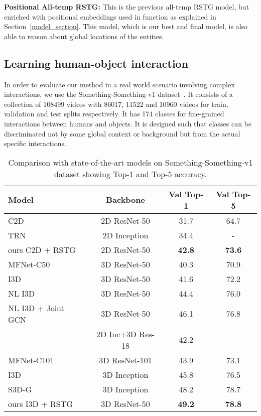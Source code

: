 \documentclass{article}
\begin{document}
\textbf{Positional All-temp RSTG:} This is the previous all-temp RSTG model, but enriched with positional embeddings used in  function as explained in Section~\ref{model_section}. This model, which is our best and final model, is also  able to reason about global locations of the entities.

\subsection{Learning human-object interaction}
In order to evaluate our method in a real world scenario involving complex interactions, we use the Something-Something-v1 dataset~\cite{goyal2017something}.
It consists of a collection of 108499 videos with 86017, 11522 and 10960 videos for train, validation and test splits respectively.  It has 174 classes for fine-grained interactions between humans and objects. It is designed such that classes can be discriminated not by some global context or background but from the actual specific interactions. 


\begin{table}[t]
    \fontsize{9}{10}\selectfont
    \caption{Comparison with state-of-the-art models on Something-Something-v1 dataset showing Top-1 and Top-5 accuracy. }
\centering
           \begin{tabular}{lccc}
                \toprule
                Model & Backbone & Val Top-1  & Val Top-5 \\ \midrule
                \midrule
C2D    &  2D ResNet-50 & 31.7 & 64.7 \\ TRN \cite{zhou2018temporal_trn_torralba}& 2D Inception & 34.4 & - \\ ours C2D + RSTG    &  2D ResNet-50 & \textbf{42.8} & \textbf{73.6} \\ \midrule
                \midrule
MFNet-C50~\cite{Lee2018MF_Net} & 3D ResNet-50 & 40.3 & 70.9 \\

                I3D \cite{wang2018videos_gupta2}    & 3D ResNet-50 & 41.6 & 72.2  \\NL I3D \cite{wang2018videos_gupta2}    & 3D ResNet-50 & 44.4 & 76.0 \\

                NL I3D + Joint GCN \cite{wang2018videos_gupta2}    &  3D ResNet-50 & 46.1 & 76.8\\\midrule 
                ~\cite{zolfaghari2018eco} & 2D Inc+3D Res-18  & 42.2 & - \\MFNet-C101~\cite{Lee2018MF_Net} & 3D ResNet-101 & 43.9 & 73.1 \\I3D \cite{xie2018rethinking} & 3D Inception & 45.8 & 76.5  \\

                S3D-G~\cite{xie2018rethinking} & 3D Inception & 48.2 & 78.7  \\\midrule
                ours I3D + RSTG & 3D ResNet-50  & \textbf{49.2} & \textbf{78.8} \\\bottomrule
            \end{tabular}
            \label{tab:results}
            \end{table}
\end{document}
